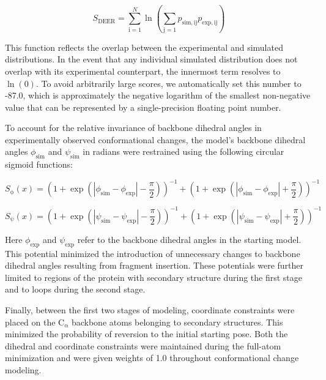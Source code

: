 \begin{equation}
    S_{\mathup{DEER}} = \sum_{\mathup{i}=1}^{N} \ln \left( \sum_{\mathup{j}=1} p_{\mathup{sim,ij}}p_{\mathup{exp,ij}} \right)
\end{equation}

This function reflects the overlap between the experimental and simulated distributions. In the event that any individual simulated distribution does not overlap with its experimental counterpart, the innermost term resolves to $\ln(0)$. To avoid arbitrarily large scores, we automatically set this number to -87.0, which is approximately the negative logarithm of the smallest non-negative value that can be represented by a single-precision floating point number.

To account for the relative invariance of backbone dihedral angles in experimentally observed conformational changes, the model's backbone dihedral angles $\phi_{\mathup{sim}}$ and $\psi_{\mathup{sim}}$ in radians were restrained using the following circular sigmoid functions:

\begin{equation}
    S_{\upphi}(x) = \left( 1 + \exp \left( | \phi_{\mathup{sim}} - \phi_{\mathup{exp}} | - \frac{\pi}{2} \right) \right)^{-1} + \left( 1 + \exp \left( | \phi_{\mathup{sim}} - \phi_{\mathup{exp}} | + \frac{\pi}{2} \right) \right)^{-1}
\end{equation}

\begin{equation}
    S_{\uppsi}(x) = \left( 1 + \exp \left( | \psi_{\mathup{sim}} - \psi_{\mathup{exp}} | - \frac{\pi}{2} \right) \right)^{-1} + \left( 1 + \exp \left( | \psi_{\mathup{sim}} - \psi_{\mathup{exp}} | + \frac{\pi}{2} \right) \right)^{-1}
\end{equation}

Here $\phi_{\mathup{exp}}$ and $\psi_{\mathup{exp}}$ refer to the backbone dihedral angles in the starting model. This potential minimized the introduction of unnecessary changes to backbone dihedral angles resulting from fragment insertion. These potentials were further limited to regions of the protein with secondary structure during the first stage and to loops during the second stage.

Finally, between the first two stages of modeling, coordinate constraints were placed on the $\mathrm{C_{\upalpha}}$ backbone atoms belonging to secondary structures. This minimized the probability of reversion to the initial starting pose. Both the dihedral and coordinate constraints were maintained during the full-atom minimization and were given weights of 1.0 throughout conformational change modeling.
